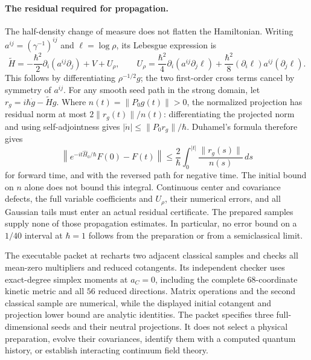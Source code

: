 \paragraph{The residual required for propagation.}
The half-density change of measure does not flatten the Hamiltonian.
Writing \(a^{ij}=(\gamma^{-1})^{ij}\) and \(\ell=\log\rho\), its
Lebesgue expression is
\begin{equation}
 \widetilde H=-\frac{\hbar^2}{2}\partial_i(a^{ij}\partial_j)+V+U_\rho,
 \qquad U_\rho=\frac{\hbar^2}{4}\partial_i(a^{ij}\partial_j\ell)
      +\frac{\hbar^2}{8}(\partial_i\ell)a^{ij}(\partial_j\ell).
 \label{eq:whitney-packet-half-density-operator}
\end{equation}
This follows by differentiating \(\rho^{-1/2}g\); the two first-order
cross terms cancel by symmetry of \(a^{ij}\). For any smooth seed path
in the strong domain, let \(r_g=i\hbar\dot g-\widetilde Hg\).
Where \(n(t)=\|P_0g(t)\|>0\), the normalized projection has residual
norm at most \(2\|r_g(t)\|/n(t)\): differentiating the projected norm
and using self-adjointness gives
\(|\dot n|\leq\|P_0r_g\|/\hbar\). Duhamel's formula therefore gives
\begin{equation}
 \left\|e^{-it\widehat H_0/\hbar}F(0)-F(t)\right\|
 \leq\frac2\hbar\int_0^{|t|}\frac{\|r_g(s)\|}{n(s)}\,ds
 \label{eq:whitney-packet-projected-residual}
\end{equation}
for forward time, and with the reversed path for negative time.
The initial bound on \(n\) alone does not bound this integral. Continuous
center and covariance defects, the full variable coefficients and
\(U_\rho\), their numerical errors, and all Gaussian tails must enter
an actual residual certificate. The prepared samples supply none of those
propagation estimates. In particular, no error bound on a \(1/40\)
interval at \(\hbar=1\) follows from the preparation or from a
semiclassical limit.

The executable packet at
recharts two adjacent classical samples and checks all mean-zero multipliers
and reduced cotangents. Its independent checker uses exact-degree simplex
moments at \(a_C=0\), including the complete \(68\)-coordinate kinetic
metric and all \(56\) reduced directions. Matrix operations and the second
classical sample are numerical, while the displayed initial cotangent and
projection lower bound are analytic identities. The packet specifies three
full-dimensional seeds and their neutral projections. It does not select a
physical preparation, evolve their covariances, identify them with a computed
quantum history, or establish interacting continuum field theory.
